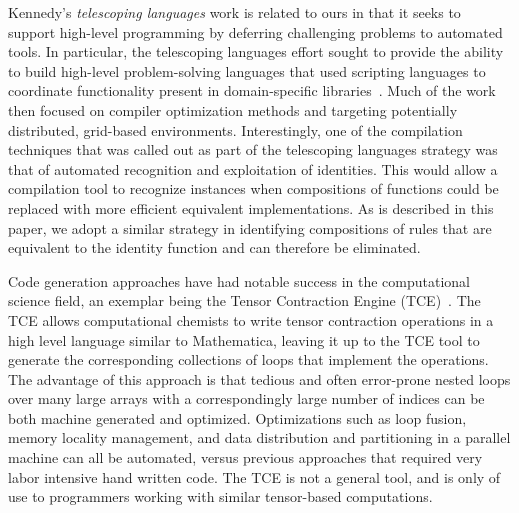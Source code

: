 Kennedy's \emph{telescoping languages} work is related to ours in that it seeks
to support high-level programming by deferring challenging problems to automated
tools. In particular, the telescoping languages effort sought to provide the
ability to build high-level problem-solving languages that used scripting
languages to coordinate functionality present in domain-specific
libraries~\cite{kennedy00telescoping}. Much of the work then focused on compiler
optimization methods and targeting potentially distributed, grid-based
environments. Interestingly, one of the compilation techniques that was called
out as part of the telescoping languages strategy was that of automated
recognition and exploitation of identities. This would allow a compilation tool
to recognize instances when compositions of functions could be replaced with
more efficient equivalent implementations. As is described in this paper, we
adopt a similar strategy in identifying compositions of rules that are
equivalent to the identity function and can therefore be eliminated.

Code generation approaches have had notable success in the computational science
field, an exemplar being the Tensor Contraction Engine
(TCE)~\cite{baumgartner05synthesis}. The TCE allows computational chemists to
write tensor contraction operations in a high level language similar to
Mathematica, leaving it up to the TCE tool to generate the corresponding
collections of loops that implement the operations. The advantage of this
approach is that tedious and often error-prone nested loops over many large
arrays with a correspondingly large number of indices can be both machine
generated and optimized. Optimizations such as loop fusion, memory locality
management, and data distribution and partitioning in a parallel machine can all
be automated, versus previous approaches that required very labor intensive hand
written code. The TCE is not a general tool, and is only of use to programmers
working with similar tensor-based computations.
